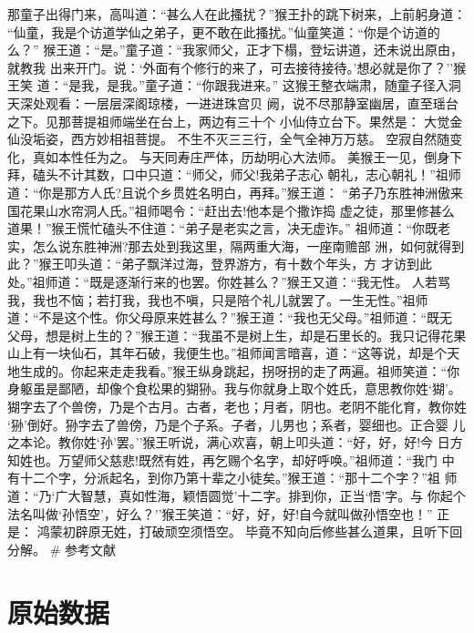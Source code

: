 \documentclass[]{style/zjuthesis}
\begin{document}
那童子出得门来，高叫道：``甚么人在此搔扰？''猴王扑的跳下树来，上前躬身道：
``仙童，我是个访道学仙之弟子，更不敢在此搔扰。''仙童笑道：``你是个访道的么？''
猴王道：``是。''童子道：``我家师父，正才下榻，登坛讲道，还未说出原由，就教我
出来开门。说：`外面有个修行的来了，可去接待接待。'想必就是你了？''猴王笑
道：``是我，是我。''童子道：``你跟我进来。''
这猴王整衣端肃，随童子径入洞天深处观看：一层层深阁琼楼，一进进珠宫贝
阙，说不尽那静室幽居，直至瑶台之下。见那菩提祖师端坐在台上，两边有三十个
小仙侍立台下。果然是： 大觉金仙没垢姿，西方妙相祖菩提。
不生不灭三三行，全气全神万万慈。 空寂自然随变化，真如本性任为之。
与天同寿庄严体，历劫明心大法师。
美猴王一见，倒身下拜，磕头不计其数，口中只道：``师父，师父!我弟子志心
朝礼，志心朝礼！''祖师道：``你是那方人氏?且说个乡贯姓名明白，再拜。''猴王道：
``弟子乃东胜神洲傲来国花果山水帘洞人氏。''祖师喝令：``赶出去!他本是个撒诈捣
虚之徒，那里修甚么道果！''猴王慌忙磕头不住道：``弟子是老实之言，决无虚诈。''
祖师道：``你既老实，怎么说东胜神洲?那去处到我这里，隔两重大海，一座南赡部
洲，如何就得到此？''猴王叩头道：``弟子飘洋过海，登界游方，有十数个年头，方
才访到此处。''祖师道：``既是逐渐行来的也罢。你姓甚么？''猴王又道：``我无性。
人若骂我，我也不恼；若打我，我也不嗔，只是陪个礼儿就罢了。一生无性。''祖师
道：``不是这个性。你父母原来姓甚么？''猴王道：``我也无父母。''祖师道：``既无
父母，想是树上生的？''猴王道：``我虽不是树上生，却是石里长的。我只记得花果
山上有一块仙石，其年石破，我便生也。''祖师闻言暗喜，道：``这等说，却是个天
地生成的。你起来走走我看。''猴王纵身跳起，拐呀拐的走了两遍。祖师笑道：``你
身躯虽是鄙陋，却像个食松果的猢狲。我与你就身上取个姓氏，意思教你姓`猢'。
猢字去了个兽傍，乃是个古月。古者，老也；月者，阴也。老阴不能化育，教你姓
`狲'倒好。狲字去了兽傍，乃是个子系。子者，儿男也；系者，婴细也。正合婴
儿之本论。教你姓`孙'罢。''猴王听说，满心欢喜，朝上叩头道：``好，好，好!今
日方知姓也。万望师父慈悲!既然有姓，再乞赐个名字，却好呼唤。''祖师道：``我门
中有十二个字，分派起名，到你乃第十辈之小徒矣。''猴王道：``那十二个字？''祖
师道：``乃`广大智慧，真如性海，颖悟圆觉'十二字。排到你，正当`悟'字。与
你起个法名叫做`孙悟空'，好么？''猴王笑道：``好，好，好!自今就叫做孙悟空也！''
正是： 鸿蒙初辟原无姓，打破顽空须悟空。
毕竟不知向后修些甚么道果，且听下回分解。 \# 参考文献

\appendix {}


\chapter{原始数据}\label{data}



\end{document}
